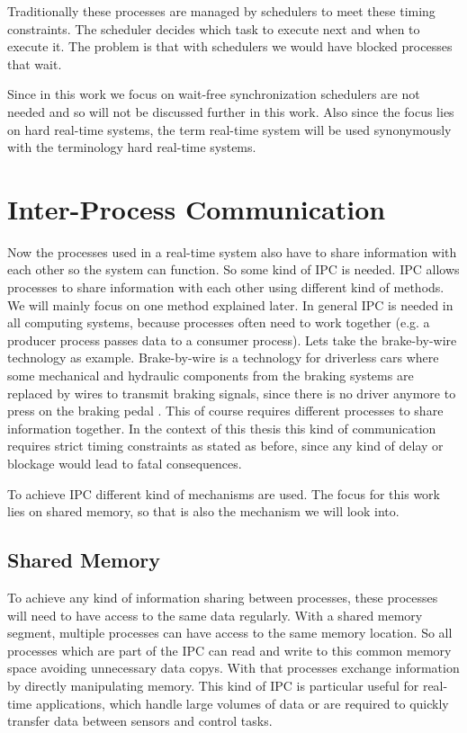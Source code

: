 Traditionally these processes are managed by schedulers to meet these timing constraints. The scheduler decides which task to execute next and when to execute it. The problem is that with schedulers we would have blocked processes that wait. \cite{HardSoftRealTime}

Since in this work we focus on wait-free synchronization schedulers are not needed and so will not be discussed further in this work. Also since the focus lies on hard real-time systems, the term real-time system will be used synonymously with the terminology hard real-time systems.

\section{Inter-Process Communication}\label{sec:ipc}

Now the processes used in a real-time system also have to share information with each other so the system can function. So some kind of \ac{IPC} is needed. \ac{IPC} allows processes to share information with each other using different kind of methods. We will mainly focus on one method explained later. In general \ac{IPC} is needed in all computing systems, because processes often need to work together (e.g. a producer process passes data to a consumer process). Lets take the brake-by-wire technology as example. Brake-by-wire is a technology for driverless cars where some mechanical and hydraulic components from the braking systems are replaced by wires to transmit braking signals, since there is no driver anymore to press on the braking pedal \cite{BrakeByWire}. This of course requires different processes to share information together. In the context of this thesis this kind of communication requires strict timing constraints as stated as before, since any kind of delay or blockage would lead to fatal consequences. \cite{IPC,IPCMechanisms}

To achieve \ac{IPC} different kind of mechanisms are used. The focus for this work lies on shared memory, so that is also the mechanism we will look into. 

\subsection{Shared Memory}\label{subsec:shared-memory}

To achieve any kind of information sharing between processes, these processes will need to have access to the same data regularly. With a shared memory segment, multiple processes can have access to the same memory location. So all processes which are part of the \ac{IPC} can read and write to this common memory space avoiding unnecessary data copys. With that processes exchange information by directly manipulating memory. This kind of \ac{IPC} is particular useful for real-time applications, which handle large volumes of data or are required to quickly transfer data between sensors and control tasks. \cite{IPCMechanisms, SharedMemory,SharedMemoryMessagePassing}

